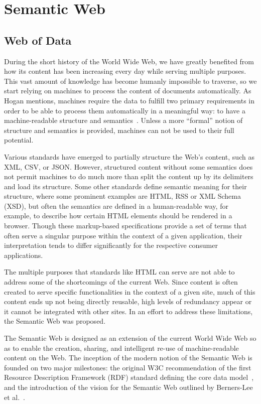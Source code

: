 \section{Semantic Web}
\label{cap2:semWeb}

\subsection{Web of Data}
\label{cap2:semWeb/webOfData}
During the short history of the World Wide Web, we have greatly benefited from how its 
content has been increasing every day while serving multiple purposes. This vast amount of 
knowledge has become humanly impossible to traverse, so we start relying on machines to 
process the content of documents automatically. As Hogan mentions, machines require the 
data to fulfill two primary requirements in order to be able to process them automatically 
in a meaningful way: to have a machine-readable structure and semantics~\cite{key:linked14-Hogan}. 
Unless a more “formal” notion of structure and semantics is provided, machines can not 
be used to their full potential.

Various standards have emerged to partially structure the Web’s content, such as XML, CSV, 
or JSON. However, structured content without some semantics does not permit machines to do 
much more than split the content up by its delimiters and load its structure. Some other 
standards define semantic meaning for their structure, where some prominent examples are 
HTML, RSS or XML Schema (XSD), but often the semantics are defined in a human-readable way, 
for example, to describe how certain HTML elements should be rendered in a browser. Though 
these markup-based specifications provide a set of terms that often serve a singular purpose 
within the context of a given application, their interpretation tends to differ significantly 
for the respective consumer applications. 

The multiple purposes that standards like HTML can serve are not able to address some of the 
shortcomings of the current Web. Since content is often created to serve specific functionalities 
in the context of a given site, much of this content ends up not being directly reusable, 
high levels of redundancy appear or it cannot be integrated with other sites. In an effort 
to address these limitations, the Semantic Web was proposed.

The Semantic Web is designed as an extension of the current World Wide Web so as to enable 
the creation, sharing, and intelligent re-use of machine-readable content on the Web. The 
inception of the modern notion of the Semantic Web is founded on two major milestones: the 
original W3C recommendation of the first Resource Description Framework (RDF) standard 
defining the core data model~\cite{key:oldrdf}, and the introduction of the vision for the 
Semantic Web outlined by Berners-Lee et al.~\cite{key:semwebsa}.

